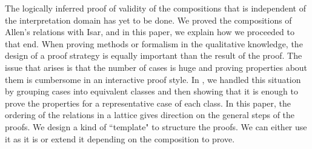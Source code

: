 \documentclass{llncs}
\begin{document}
The logically inferred proof of validity of the compositions  that is independent of the interpretation domain has yet to be done. We proved  the  compositions  of Allen's relations with Isar, and in this paper, we explain how we proceeded to that end. %
When proving methods or formalism in the qualitative knowledge,  the design of a proof strategy is equally important than the result of the proof. The issue that arises is that the number of cases is huge and proving properties about them is cumbersome in an  interactive proof style. In \cite{Fadoua:2015}, we handled this situation by grouping cases  into equivalent classes and then showing that it is enough to prove the properties for a representative case of each class. In this paper, the ordering of the relations in a lattice gives direction on the general steps of the proofs. We  design a kind of ``template" to structure the proofs. We can either use it as it is or extend it depending on the composition to prove.  %
\end{document}
